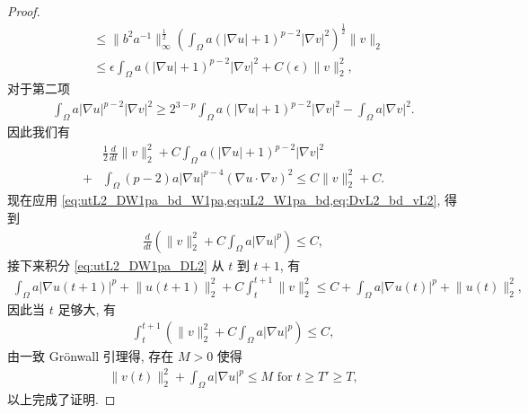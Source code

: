 \documentclass[twoside,longtitle]{LZUthesis}
\theoremstyle{definition}
\numberwithin{equation}{chapter}
\newcommand*\abs[1]{\lvert#1\rvert}
\newcommand*\norm[1]{\lVert#1\rVert}
\begin{document}
\begin{proof}
\begin{equation}
\begin{split}
			&\leq \norm{b^2 a^{-1}}_{\infty}^{\frac{1}{2}}
			\left(\int_{\Omega}a\left(\abs{\nabla u}+1\right)^{p-2}\abs{\nabla v}^2\right)^{\frac{1}{2}}\norm{v}_2\\
			&\leq \epsilon \int_{\Omega}a\left(\abs{\nabla u}+1\right)^{p-2}\abs{\nabla v}^2
			+ C(\epsilon) \norm{v}_2^2,
		\end{split}
	\end{equation}
	对于第二项
	\begin{equation}
		\begin{split}
			\int_{\Omega}a\abs{\nabla u}^{p-2}\abs{\nabla v}^2
			\geq 2^{3-p}\int_{\Omega}a\left(\abs{\nabla u}+1\right)^{p-2}\abs{\nabla v}^2
			- \int_{\Omega}a\abs{\nabla v}^2.
		\end{split}
	\end{equation}
	因此我们有
	\begin{equation}\label{eq:DvL2_bd_vL2}
		\begin{split}
			& \frac{1}{2}\frac{d}{dt}\norm{v}_2^2
			+ C\int_{\Omega}a\left(\abs{\nabla u}+1\right)^{p-2}\abs{\nabla v}^2\\
			+{} & \int_{\Omega}\left(p-2\right)a\abs{\nabla u}^{p-4}\left(\nabla u
			\cdot \nabla v\right)^2
			\leq C\norm{v}_2^2 + C.
		\end{split}
	\end{equation}
	现在应用 \cref{eq:utL2_DW1pa_bd_W1pa,eq:uL2_W1pa_bd,eq:DvL2_bd_vL2},
	得到
	\begin{equation}
		\begin{split}
			\frac{d}{dt}\left(
			\norm{v}_2^2 + C\int_{\Omega}a\abs{\nabla u}^p
			\right)
			\leq C,
		\end{split}
	\end{equation}
	接下来积分 \cref{eq:utL2_DW1pa_DL2} 从 $t$ 到 $t+1$, 有
	\begin{equation}
		\begin{split}
			\int_{\Omega}a\abs{\nabla u(t+1)}^p
			+ \norm{u(t+1)}_2^2
			+ C\int_t^{t+1}\norm{v}_2^2
			\leq C + \int_{\Omega}a\abs{\nabla u(t)}^p
			+ \norm{u(t)}_2^2,
		\end{split}
	\end{equation}
	因此当 $t$ 足够大, 有
	\begin{equation}
		\begin{split}
			\int_t^{t+1}\left(
			\norm{v}_2^2 + C\int_{\Omega}a\abs{\nabla u}^p
			\right) \leq C,
		\end{split}
	\end{equation}
	由一致 Gr\"onwall 引理得, 存在 $M > 0$ 使得
	\begin{equation}
		\begin{split}
			\norm{v(t)}_2^2
			+ \int_{\Omega}a\abs{\nabla u}^p \leq M \text{ for } t \geq T' \geq T,
		\end{split}
	\end{equation}
	以上完成了证明.
\end{proof}
\end{document}
